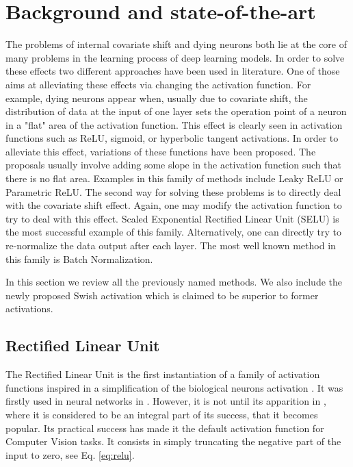 \documentclass[10pt,twocolumn,letterpaper]{article}
\begin{document}
\section{Background and state-of-the-art}\label{sec:review}

The problems of internal covariate shift and dying neurons both lie at the core of many problems in the learning process of deep learning models. In order to solve these effects two different approaches have been used in literature. One of those aims at alleviating these effects via changing the activation function. For example, dying neurons appear when, usually due to covariate shift, the distribution of data at the input of one layer sets the operation point of a neuron in a "flat" area of the activation function. This effect is clearly seen in activation functions such as ReLU, sigmoid, or hyperbolic tangent activations. In order to alleviate this effect, variations of these functions have been proposed. The proposals usually involve adding some slope in the activation function such that there is no flat area. Examples in this family of methods include Leaky ReLU\cite{leakyrelu} or Parametric ReLU\cite{prelu}. The second way for solving these problems is to directly deal with the covariate shift effect. Again, one may modify the activation function to try to deal with this effect. Scaled Exponential Rectified Linear Unit\cite{selu} (SELU) is the most successful example of this family. Alternatively, one can directly try to re-normalize the data output after each layer. The most well known method in this family is Batch Normalization\cite{batchnorm}. 

In this section we review all the previously named methods. We also include the newly proposed Swish activation \cite{swish} which is claimed to be superior to former activations.

\subsection{Rectified Linear Unit}

The Rectified Linear Unit is the first instantiation of a family of activation functions inspired in a simplification of the biological neurons activation \cite{relu_neurology}. It was firstly used in neural networks in \cite{firstrelu}. However, it is not until its apparition in \cite{alexnet}, where it is considered to be an integral part of its success, that it becomes popular. Its practical success has made it the default activation function for Computer Vision tasks. It consists in simply truncating the negative part of the input to zero, see Eq. \ref{eq:relu}.
\end{document}

